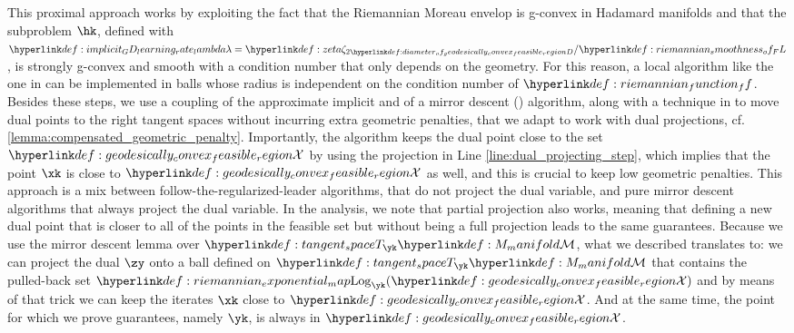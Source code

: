 \documentclass[12pt]{alt2021}
\begin{document}
This proximal approach works by exploiting the fact that the Riemannian Moreau envelop is g-convex in Hadamard manifolds \citep{azagra2005inf} and that the subproblem $\hk$, defined with $\lambda=\zeta{2\D}/\L $, is strongly g-convex and smooth with a condition number that only depends on the geometry. For this reason, a local algorithm like the one in \citep{criscitiello2022negative} can be implemented in balls whose radius is independent on the condition number of $\f$. Besides these steps, we use a coupling of the approximate implicit \RGD{} and of a mirror descent () algorithm, along with a technique in \citep{kim2022accelerated} to move dual points to the right tangent spaces without incurring extra geometric penalties, that we adapt to work with dual projections, cf. \cref{lemma:compensated_geometric_penalty}. Importantly, the \MD{} algorithm keeps the dual point close to the set $\X$ by using the projection in Line \ref{line:dual_projecting_step}, which implies that the point $\xk$ is close to $\X$ as well, and this is crucial to keep low geometric penalties. This \MD{} approach is a mix between follow-the-regularized-leader algorithms, that do not project the dual variable, and pure mirror descent algorithms that always project the dual variable. In the analysis, we note that partial projection also works, meaning that defining a new dual point that is closer to all of the points in the feasible set but without being a full projection leads to the same guarantees. Because we use the mirror descent lemma over $\Tansp{\yk}\M$, what we described translates to: we can project the dual $\zy$ onto a ball defined on $\Tansp{\yk}\M$ that contains the pulled-back set $\exponinv{\yk}(\X)$ and by means of that trick we can keep the iterates $\xk$ close to $\X$. And at the same time, the point for which we prove guarantees, namely $\yk$, is always in $\X$.
\end{document}
